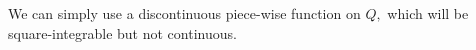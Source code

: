 \documentclass{article}
\begin{document}
\begin{itemize}
\begin{soln}
			We can simply use a discontinuous piece-wise function on $Q,$ which will be square-integrable but not continuous.
		\end{soln}

\end{itemize}
\end{document}
